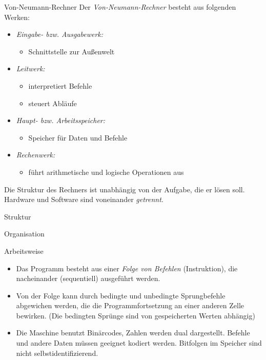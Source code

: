 \begin{defi}{Von-Neumann-Rechner}
    Der \emph{Von-Neumann-Rechner} besteht aus folgenden Werken:
    \begin{itemize}
        \item \emph{Eingabe- bzw. Ausgabewerk:}
              \begin{itemize}
                  \item Schnittstelle zur Außenwelt
              \end{itemize}
        \item \emph{Leitwerk:}
              \begin{itemize}
                  \item interpretiert Befehle
                  \item steuert Abläufe
              \end{itemize}
        \item \emph{Haupt- bzw. Arbeitsspeicher:}
              \begin{itemize}
                  \item Speicher für Daten und Befehle
              \end{itemize}
        \item \emph{Rechenwerk:}
              \begin{itemize}
                  \item führt arithmetische und logische Operationen aus
              \end{itemize}
    \end{itemize}
    
    Die Struktur des Rechners ist unabhängig von der Aufgabe, die er lösen soll.
    Hardware und Software sind voneinander \emph{getrennt}.
\end{defi}

\begin{defi}{Struktur}
    
\end{defi}

\begin{defi}{Organisation}
    
\end{defi}

\begin{defi}{Arbeitsweise}
    \begin{itemize}
        \item Das Programm besteht aus einer \emph{Folge von Befehlen} (Instruktion),
              die nacheinander (sequentiell) ausgeführt werden.
        \item Von der Folge kann durch bedingte und unbedingte Sprungbefehle abgewichen werden, die die Programmfortsetzung an einer anderen Zelle bewirken.
              (Die bedingten Sprünge sind von gespeicherten Werten abhängig)
        \item Die Maschine benutzt Binärcodes, Zahlen werden dual dargestellt.
              Befehle und andere Daten müssen geeignet kodiert werden.
              Bitfolgen im Speicher sind nicht selbstidentifizierend.
    \end{itemize}
\end{defi}

